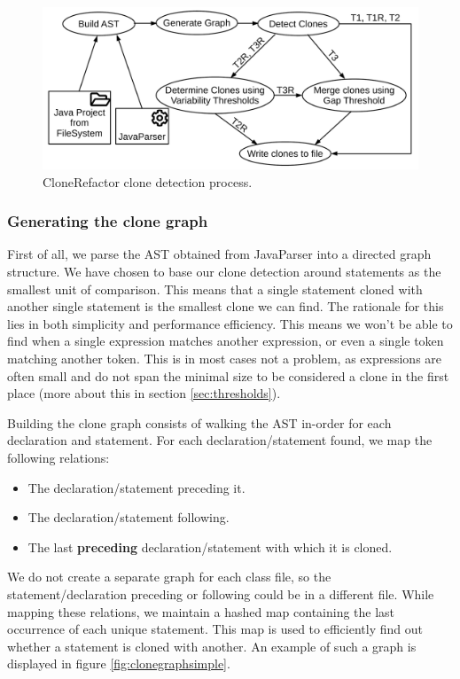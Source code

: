 \begin{figure}[H]
  \centering
  \includegraphics[width=1\columnwidth]{img/CloneDetection}
  \caption{CloneRefactor clone detection process.}
  \label{fig:clonedetection}
\end{figure}

\subsubsection{Generating the clone graph}\label{sec:clonegraph}
First of all, we parse the AST obtained from JavaParser into a directed graph structure. We have chosen to base our clone detection around statements as the smallest unit of comparison. This means that a single statement cloned with another single statement is the smallest clone we can find. The rationale for this lies in both simplicity and performance efficiency. This means we won't be able to find when a single expression matches another expression, or even a single token matching another token. This is in most cases not a problem, as expressions are often small and do not span the minimal size to be considered a clone in the first place (more about this in section \ref{sec:thresholds}).

Building the clone graph consists of walking the AST in-order for each declaration and statement. For each declaration/statement found, we map the following relations:
\begin{itemize}
  \item The declaration/statement preceding it.
  \item The declaration/statement following.
  \item The last \textbf{preceding} declaration/statement with which it is cloned.
\end{itemize}
We do not create a separate graph for each class file, so the statement/declaration preceding or following could be in a different file. While mapping these relations, we maintain a hashed map containing the last occurrence of each unique statement. This map is used to efficiently find out whether a statement is cloned with another. An example of such a graph is displayed in figure \ref{fig:clonegraphsimple}.

